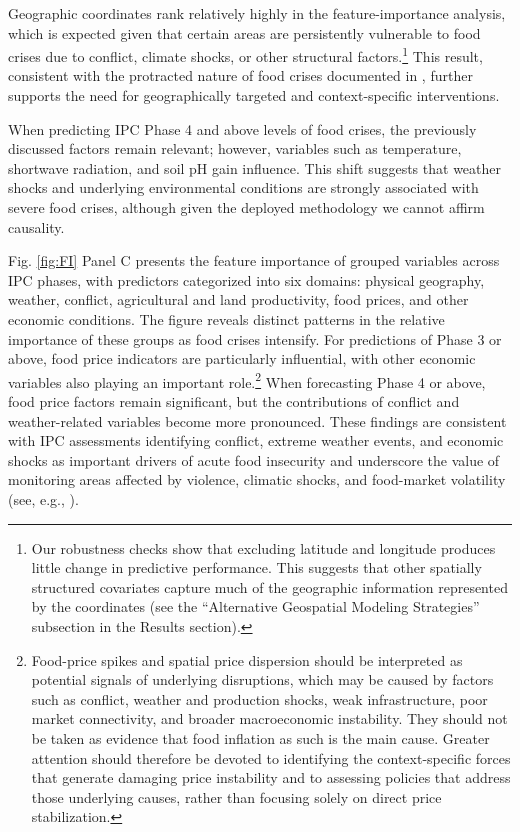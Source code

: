 \documentclass[pdflatex,sn-mathphys-num]{sn-jnl}%
\theoremstyle{thmstyleone}%
\theoremstyle{thmstyletwo}%
\theoremstyle{thmstylethree}%
\begin{document}
Geographic coordinates rank relatively highly in the feature-importance analysis, which is expected given that certain areas are persistently vulnerable to food crises due to conflict, climate shocks, or other structural factors.\footnote{Our robustness checks show that excluding latitude and longitude produces little change in predictive performance. This suggests that other spatially structured covariates capture much of the geographic information represented by the coordinates (see the “Alternative Geospatial Modeling Strategies” subsection in the Results section).} This result, consistent with the protracted nature of food crises documented in \citep{FSIN2025}, further supports the need for geographically targeted and context-specific interventions.

When predicting IPC Phase 4 and above levels of food crises, the previously discussed factors remain relevant; however, variables such as temperature, shortwave radiation, and soil pH gain influence. This shift suggests that weather shocks and underlying environmental conditions are strongly associated with severe food crises, although given the deployed methodology we cannot affirm causality.

Fig. \ref{fig:FI} Panel C presents the feature importance of grouped variables across IPC phases, with predictors categorized into six domains: physical geography, weather, conflict, agricultural and land productivity, food prices,  
and other economic conditions. The figure reveals distinct patterns in the relative importance of these groups as food crises intensify. For predictions of Phase 3 or above, food price indicators are particularly influential, with other economic variables also playing an important role.\footnote{Food-price spikes and spatial price dispersion should be interpreted as potential signals of underlying disruptions, which may be caused by factors such as conflict, weather and production shocks, weak infrastructure, poor market connectivity, and broader macroeconomic instability. They should not be taken as evidence that food inflation as such is the main cause. Greater attention should therefore be devoted to identifying the context-specific forces that generate damaging price instability and to assessing policies that address those underlying causes, rather than focusing solely on direct price stabilization.} When forecasting Phase 4 or above, food price factors remain significant, but the contributions of conflict and weather-related variables become more pronounced. These findings are consistent with IPC assessments identifying conflict, extreme weather events, and economic shocks as important drivers of acute food insecurity and underscore the value of monitoring areas affected by violence, climatic shocks, and food-market volatility (see, e.g., \cite{FSIN2025}).
\end{document}

